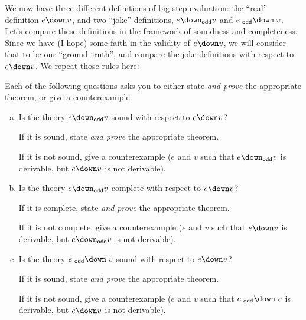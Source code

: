\medskip
{}

We now have three different definitions of big-step evaluation: the ``real'' definition $e \down v$,
and two ``joke'' definitions, $e \downodd v$ and $e \odddown v$.
Let's compare these definitions in the framework of soundness and completeness.
Since we have (I hope) some faith in the validity of $e \down v$, we will consider that
to be our ``ground truth'', and compare the joke definitions with respect to $e \down v$.  We repeat those rules here:

\medskip
{}
\vspace*{-1.2ex}

Each of the following questions asks you to either state \emph{and prove} the appropriate theorem, or give a counterexample.


\begin{enumerate}[(a)]
\item Is the theory $e \downodd v$ sound with respect to $e \down v$?

  If it is sound, state \emph{and prove} the appropriate theorem.

  If it is not sound, give a counterexample ($e$ and $v$ such that
  $e \downodd v$ is derivable, but $e \down v$ is not derivable).

\item Is the theory $e \downodd v$ complete with respect to $e \down v$?

  If it is complete, state \emph{and prove} the appropriate theorem.

  If it is not complete, give a counterexample ($e$ and $v$ such that
  $e \down v$ is derivable, but $e \downodd v$ is not derivable).

\item Is the theory $e \odddown v$ sound with respect to $e \down v$?

  If it is sound, state \emph{and prove} the appropriate theorem.

  If it is not sound, give a counterexample ($e$ and $v$ such that
  $e \odddown v$ is derivable, but $e \down v$ is not derivable).

\end{enumerate}

